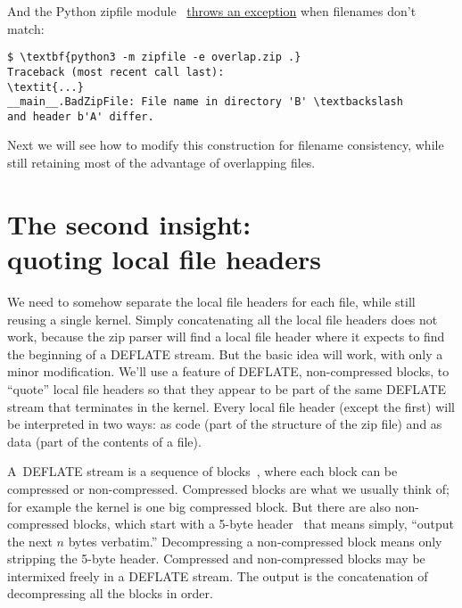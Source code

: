 \documentclass[letterpaper,twocolumn,10pt]{article}
\begin{document}
\noindent
And the Python zipfile module~\cite{python-zipfile}
\href{https://github.com/python/cpython/blob/v3.7.0/Lib/zipfile.py#L1486-L1489}{throws an exception}
when filenames don't match:

{\small
\begin{Verbatim}[commandchars=\\\{\}]
$ \textbf{python3 -m zipfile -e overlap.zip .}
Traceback (most recent call last):
\textit{...}
__main__.BadZipFile: File name in directory 'B' \textbackslash
and header b'A' differ.
\end{Verbatim}
}

Next we will see how to modify this construction
for filename consistency,
while still retaining most of the advantage
of overlapping files.



\section{The second insight:\\quoting local file headers}
\label{sec:quote}

We need to somehow separate the local file headers for each file,
while still reusing a single kernel.
Simply concatenating all the local file headers does not work,
because the zip parser will find a local file header
where it expects to find the beginning of a DEFLATE stream.
But the basic idea will work, with only a minor modification.
We'll use a feature of DEFLATE, non-compressed blocks,
to ``quote'' local file headers
so that they appear to be part of the same DEFLATE stream
that terminates in the kernel.
Every local file header
(except the first)
will be interpreted in two ways:
as code (part of the structure of the zip file)
and as data (part of the contents of a file).

A~DEFLATE stream is a sequence of
blocks~\cite[\S 3.2.3]{rfc1951},
where each block can be compressed or non-compressed.
Compressed blocks are what we usually think of;
for example the kernel is one big compressed block.
But there are also non-compressed blocks,
which start with a
5-byte header~\cite[\S 3.2.4]{rfc1951}
that means simply, ``output the next $n$ bytes verbatim.''
Decompressing a non-compressed block means only stripping the 5-byte header.
Compressed and non-compressed blocks may be intermixed freely
in a DEFLATE stream.
The output is the concatenation of
decompressing all the blocks in order.
\end{document}

